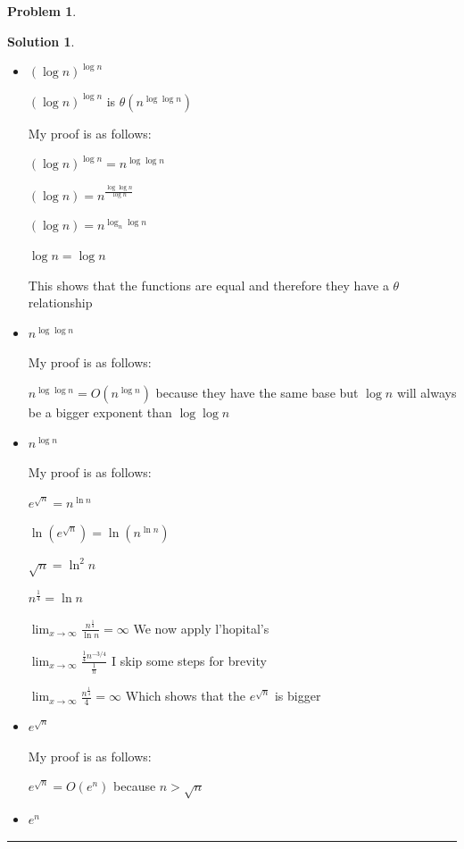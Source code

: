 \documentclass{article}
\theoremstyle{definition}
\newtheorem{problem}{Problem}
\def\fline{\rule{0.75\linewidth}{0.5pt}}
\newcommand{\finishline}{
  \begin{center}\fline
\end{center}}
\newtheorem*{solution*}{Solution}
\newenvironment{solution}{
\begin{solution*}}{{\finishline}
\end{solution*}}
\begin{document}
\begin{problem}
\begin{enumerate}
\begin{solution}
\begin{itemize}
            $ln (n^2) = ln((\ln n) ^ {ln n})$
            $2*ln(n) = \ln n * (\ln \ln n)$

            $ 2= \ln \ln n$

            2 is less than $\ln \ln n$ in the limit so we prove $(\log n)^{log n}$ is bigger
          \item $(\log n)^{\log n}$

            $(\log n)^{\log n}$ is $\theta(n^{\log \log n})$

            My proof is as follows:

            $(\log n) ^ {\log n} = n^{\log \log n}$

            $(\log n) = n^{\frac{\log \log n}{\log n}}$

            $(\log n) = n^{\log_n \log n}$

            $\log n = \log n$

            This shows that the functions are equal and therefore they have a $\theta$ relationship
          \item $n^{\log \log n}$

            My proof is as follows:

            $n^{\log \log n} = O(n^{\log n})$ because they have the same base but $\log n$ will always be a bigger exponent than $\log \log n$
          \item $n^{\log n}$

            My proof is as follows:

            $ e ^{\sqrt {n}} = n^{\ln n}$

            $ \ln (e ^{\sqrt {n}}) = \ln(n^{\ln n})$

            $ \sqrt {n} = \ln^2 n$

            $ n^{\frac{1}{4}} = \ln n$

            $ \lim_{x \to \infty} \frac{n^{\frac{1}{4}}}{\ln n} = \infty$ We now apply l'hopital's

            $ \lim_{x \to \infty} \frac{\frac{1}{4}n^{-{3/4}}}{\frac{1}{n}}$ I skip some steps for brevity

            $ \lim_{x \to \infty} \frac{n^{\frac{1}{4}}}{4} = \infty$ Which shows that the $e^{\sqrt{n}}$ is bigger
          \item $e^{\sqrt{n}}$

            My proof is as follows:

            $e^{\sqrt{n}} = O(e^n)$ because $n>\sqrt{n}$
          \item $e^n$


\end{itemize}
\end{solution}
\end{enumerate}
\end{problem}
\end{document}
